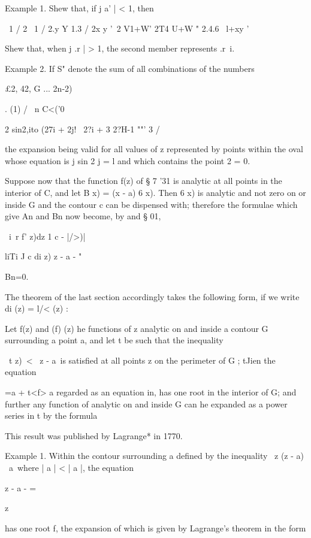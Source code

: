 Example 1. Shew that, if j a' | < 1, then

\ 1 / 2 \ 1 / 2.y Y 1.3 / 2x y '~2 V1+W' 2T4 U+W " 2.4.6 \ l+xy '

Shew that, when j .r | > 1, the second member represents .r~i.

Example 2. If S" denote the sum of all combinations of the numbers

£2, 42, G ... 2n-2)%

. (1) / \ n C<('0

2 sin2,ito (27i + 2j! \ 2?i + 3 2?H-1 ""' 3 /

the expansion being valid for all values of z represented by points
within the oval whose equation is j sin 2 j = l and which contains the
point 2 = 0. 


Suppose now that the function f(z) of § 7 '31 is analytic at all
points in the interior of C, and let B x) = (x - a) 6 x). Then 6 x) is
analytic and not zero on or inside G and the contour c can be
dispensed with; therefore the formulae which give An and Bn now
become, by and § 01,

\ i\ r f' z)dz 1 c - |/>)|

liTi J c di z) z - a - "

Bn=0.

%
%

The theorem of the last section accordingly takes the following form,
if we write di (z) = l/< (z) :

Let f(z) and (f) (z) he functions of z analytic on and inside a
contour G surrounding a point a, and let t be such that the inequality

\ t z)\ < \ z - a\ is satisfied at all points z on the perimeter of G
; tJien the equation

 =a + t<f> a regarded as an equation in, has one root in the interior
of G; and further any function of analytic on and inside G can he
expanded as a power series in t by the formula

This result was published by Lagrange* in 1770.

Example 1. Within the contour surrounding a defined by the inequality
\ z (z - a) \ a\, where | a | < | a |, the equation

z - a - =

z

has one root f, the expansion of which is given by Lagrange's theorem
in the form


